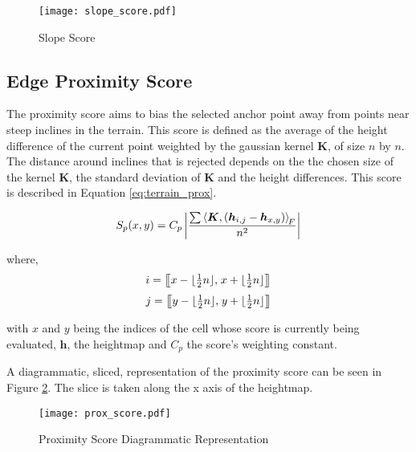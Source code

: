         \begin{figure}[h]
            \centering
            \texttt{[image: slope\_score.pdf]}
            \caption{Slope Score}
            \label{fig:slope_score}
        \end{figure}

    \subsection{Edge Proximity Score}
    The proximity score aims to bias the selected anchor point away from points near steep inclines in the terrain. This score is defined as the average of the height
    difference of the current point weighted by the gaussian kernel \(\boldsymbol{K}\), of size \(n\) by \(n\). The distance around inclines that is rejected depends on the the
    chosen size of the kernel \(\boldsymbol{K}\), the standard deviation of \(\boldsymbol{K}\) and the height differences. This score is described in Equation
    \ref{eq:terrain_prox}.

    \begin{equation} \label{eq:terrain_prox}
        S_p(x,y) = C_p\left|\frac{\sum\left\langle\boldsymbol{K},(\boldsymbol{h}_{i,j}-\boldsymbol{h}_{x,y})\right\rangle _{\mkern-3mu F}}{n^2}\right|
    \end{equation}

    \noindent
    where,
    \[i = \big[\mkern-4.7mu\big[x- \lfloor\tfrac{1}{2}n\rfloor,\mkern2mu x+\lfloor\tfrac{1}{2}n\rfloor\big]\mkern-4.7mu\big]\]
    \[j = \big[\mkern-4.7mu\big[y-\lfloor\tfrac{1}{2}n\rfloor,\mkern2mu y+ \lfloor\tfrac{1}{2}n\rfloor\big]\mkern-4.7mu\big]\]
    
    
    \noindent
    with \(x\) and \(y\) being the indices of the cell whose score is currently being evaluated, \(\boldsymbol{h}\), the heightmap and \(C_p\) the score's weighting constant.
    
    A diagrammatic, sliced, representation of the proximity score can be seen in Figure \ref{fig:prox_score_diagram}. The
    slice is taken along the x axis of the heightmap.

    \begin{figure}[h]
        \centering
        \texttt{[image: prox\_score.pdf]}
        \caption{Proximity Score Diagrammatic Representation}
        \label{fig:prox_score_diagram}
    \end{figure}


